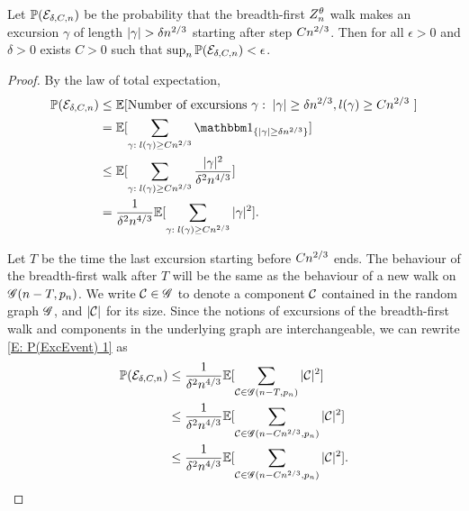 \begin{lemma} \label{L: late excursions}
	Let 
	$\mathbb{P}(\mathcal{E}_{\delta, C, n})$ 
	be the probability that the breadth-first $Z_n^{\theta}$ walk makes an excursion $\gamma$ of length 
	$|\gamma| > \delta n^{2 / 3}$ starting after step $Cn^{2 / 3}$.
	Then for all $\epsilon>0$ and $\delta > 0$ exists $C>0$ such that $\sup_n \mathbb{P}(\mathcal{E}_{\delta, C, n}) < \epsilon$. 
\end{lemma}

\begin{proof}
	By the law of total expectation,
	\begin{equation} \label{E: P(ExcEvent) 1}
	\begin{aligned}
	\Prob(\ExcursionEvent) 
	&\leq \Exp{ \text{Number of excursions $\gamma: \; |\gamma| \geq \delta\n{2}{3},l(\gamma) \geq C\n{2}{3}$ } } \\
	&= \Exp{ \sum_{\gamma: \; l(\gamma) \geq C\n{2}{3}} \Ind{\{|\gamma| \geq \delta\n{2}{3} \} } } \\
	&\leq \Exp{ \sum_{\gamma: \; l(\gamma) \geq C\n{2}{3}} \frac{|\gamma|^2}{\delta^2\n{4}{3}} } \\
	&= \frac{1}{\delta^2\n{4}{3}} \Exp{ \sum_{\gamma: \; l(\gamma) \geq C\n{2}{3}}  |\gamma|^2 }.
	\end{aligned}
	\end{equation}
	
	Let $T$ be the time the last excursion starting before $Cn^{2 / 3}$ ends.
	The behaviour of the breadth-first walk after $T$ will be the same as the behaviour of a new walk on $\mathscr{G}(n-T, p_n)$.
	We write $\mathcal{C} \in \mathscr{G}$ to denote a component $\mathcal{C}$ contained in the random graph $\mathscr{G}$,
	and $|\mathcal{C}|$ for its size.
	Since the notions of excursions of the breadth-first walk and components in the underlying graph are interchangeable,
	we can rewrite \eqref{E: P(ExcEvent) 1} as
	\begin{equation} \label{E: P(ExcEvent) 2}
	\begin{aligned}
	\mathbb{P}(\mathcal{E}_{\delta, C, n}) 
	&\leq \frac{1}{\delta^2n^{4 / 3}} \mathbb{E}[ \sum_{\mathcal{C} \in \mathscr{G}(n-T, p_n)}  |\mathcal{C}|^2  ] \\
	&\leq \frac{1}{\delta^2n^{4 / 3}} \mathbb{E}[ \sum_{\mathcal{C} \in \mathscr{G}(n-Cn^{2 / 3}, p_n)}  |\mathcal{C}|^2  ] \\
	&\leq \frac{1}{\delta^2n^{4 / 3}} \mathbb{E}[ \sum_{\mathcal{C} \in \mathscr{G}(n-Cn^{2 / 3}, p_n)}  |\mathcal{C}|^2 ].
	\end{aligned}
	\end{equation}
	

\end{proof}
